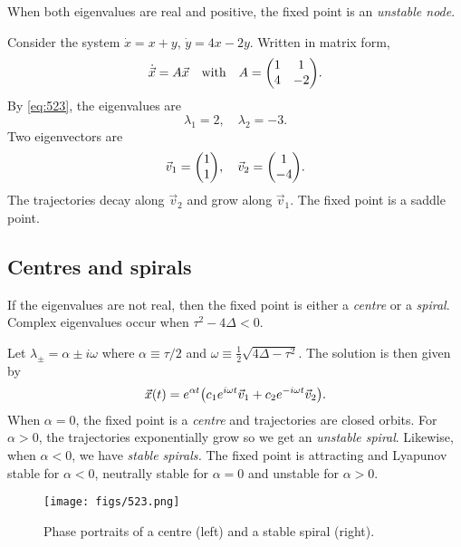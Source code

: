 \documentclass[oneside]{book}
\begin{document}
\begin{definition}
	When both eigenvalues are real and positive, the fixed point is an \textit{unstable node}.
\end{definition}
\begin{example}
	Consider the system $ \dot{x} = x + y $, $ \dot{y} = 4x - 2y $. Written in matrix form, 
	\[ 
	\dot{\vec{x}} = A \vec{x} \qq{with}  A = \mqty(1 & 1 \\ 4 & -2).
	\] 
	By \eqref{eq:523}, the eigenvalues are
	\[
	\lambda_1 = 2, \quad \lambda_2 = -3.
	\]
	Two eigenvectors are
	\[
	\vec{v}_1 = \mqty(1 \\ 1), \quad \vec{v}_2 = \mqty(1 \\ -4).
	\]
	The trajectories decay along $ \vec{v}_2 $ and grow along $ \vec{v}_1 $. The fixed point is a saddle point.
\end{example}
\subsection{Centres and spirals}
If the eigenvalues are not real, then the fixed point is either a \textit{centre} or a \textit{spiral}. Complex eigenvalues occur when $ \tau^2 - 4 \Delta < 0 $. 
\par
Let $ \lambda_{\pm} = \alpha \pm i \omega $ where $ \alpha \equiv \tau / 2 $ and $ \omega \equiv \tfrac{1}{2}\sqrt{4\Delta - \tau^2} $. The solution is then given by
\[
\vec{x}(t) = e^{\alpha t} \qty(c_1 e^{i\omega t} \vec{v}_1 + c_2 e^{-i \omega t} \vec{v}_2).
\]
When $ \alpha = 0 $, the fixed point is a \textit{centre} and trajectories are closed orbits. For $ \alpha > 0 $, the trajectories exponentially grow so we get an \textit{unstable spiral}. Likewise, when $ \alpha < 0 $, we have \textit{stable spirals.} The fixed point is attracting and Lyapunov stable for $ \alpha < 0 $, neutrally stable for $ \alpha = 0 $ and unstable for $ \alpha > 0 $. 
\begin{figure}[h]
	\centering
	\texttt{[image: figs/523.png]}
	\caption{Phase portraits of a centre (left) and a stable spiral (right).}
\end{figure}
\end{document}
